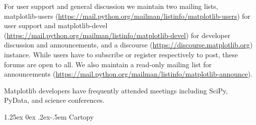 \documentclass[12pt]{article}
\makeatletter
\numberwithin{page}{section}
\renewcommand{\paragraph}{%
  \@startsection{paragraph}{4}%
  {\z@}{1.25ex \@plus 0ex \@minus .2ex}{-.5em}%
  {\normalfont\normalsize\itshape\bfseries}%
}
\makeatother
\begin{document}
For user support and general discussion we maintain two mailing lists,
matplotlib-users
(\url{https://mail.python.org/mailman/listinfo/matplotlib-users}) for
user support and matplotlib-devel
(\url{https://mail.python.org/mailman/listinfo/matplotlib-devel}) for
developer discussion and announcements, and a discourse
(\url{https://discourse.matplotlib.org}) instance.  While users have
to subscribe or register respectively to post, these forums are open
to all.  We also maintain a read-only mailing list for announcements
(\url{https://mail.python.org/mailman/listinfo/matplotlib-announce}).

Matplotlib developers have frequently attended meetings including
SciPy, PyData, and science conferences.

\paragraph{Cartopy}


\newpage

\def\ref@jnl#1{{\rm#1}}
\end{document}
